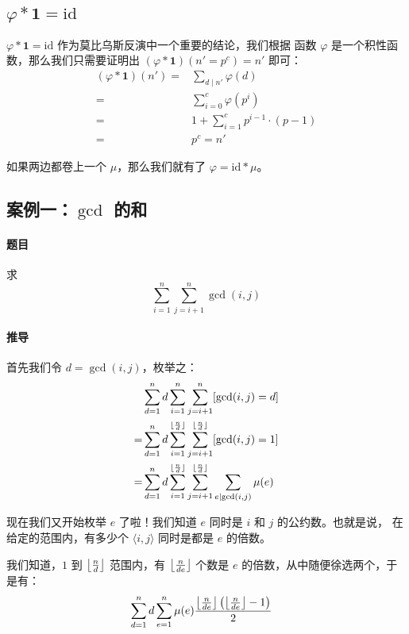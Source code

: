 \subsection{$\varphi * \mathbf{1} = \mathrm{id}$}
$\varphi * \mathbf{1} = \mathrm{id}$ 作为莫比乌斯反演中一个重要的结论，我们根据
函数 $\varphi$ 是一个积性函数，那么我们只需要证明出 $(\varphi * \mathbf{1})(n' =
p^c) = n'$ 即可：\begin{align*}
    (\varphi * \mathbf{1})(n') = {} & \sum_{d \mid n'} \varphi(d) \\
                               = {} & \sum_{i = 0}^{c} \varphi(p^i) \\
                               = {} & 1 + \sum_{i = 1}^{c} p^{i - 1} \cdot (p - 1) \\
                               = {} & p^c = n'
\end{align*}

如果两边都卷上一个 $\mu$，那么我们就有了 $\varphi = \mathrm{id} * \mu$。



\subsection{案例一：$\gcd$ 的和}
\paragraph{题目} 求 \[
    \sum_{i=1}^{n} \sum_{j=i+1}^{n} \gcd(i, j)
\]

\paragraph{推导} 首先我们令 $d = \gcd(i, j)$，枚举之：\begin{align*}
     & \sum_{d=1}^{n} d \sum_{i=1}^{n} \sum_{j=i+1}^{n} [\gcd(i, j) = d]\\
    =& \sum_{d=1}^{n} d \sum_{i=1}^{\lfloor{n \over d}\rfloor}
    \sum_{j=i+1}^{\lfloor{n \over d}\rfloor} [\gcd(i, j) = 1] \\
    =& \sum_{d=1}^{n} d \sum_{i=1}^{\lfloor{n \over d}\rfloor}
    \sum_{j=i+1}^{\lfloor{n \over d}\rfloor} \sum_{e \mid \gcd(i, j)} \mu(e)
\end{align*}

现在我们又开始枚举 $e$ 了啦！我们知道 $e$ 同时是 $i$ 和 $j$ 的公约数。也就是说，
在给定的范围内，有多少个 $\langle i, j \rangle$ 同时是都是 $e$ 的倍数。

我们知道，$1$ 到 $\left\lfloor{n \over d}\right\rfloor$ 范围内，有
$\left\lfloor{n \over de}\right\rfloor$ 个数是 $e$ 的倍数，从中随便徐选两个，于
是有：\begin{align*}
    & \sum_{d=1}^{n} d \sum_{e=1}^{n} \mu(e) { \left\lfloor{n \over
        de}\right\rfloor \left(\left\lfloor{n \over de}\right\rfloor - 1\right)
        \over 2}
\end{align*}

